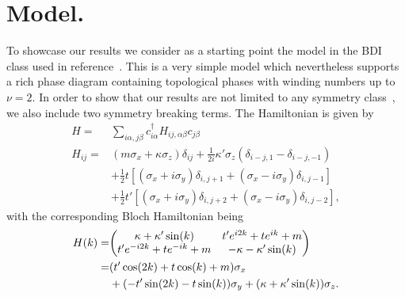 \documentclass[twocolumn,amsmath,longbibliography,amssymb,superscriptaddress]{revtex4-1}
\begin{document}
\section{Model.}
To showcase our results we consider as a starting point the model in the BDI class used in reference~\cite{Song2014}. 
This is a very simple model which nevertheless supports a rich phase diagram containing topological phases with winding numbers up to $\nu =2$. 
In order to show that our results are not limited to any symmetry class~\cite{ryu2010topological}, we also include two symmetry breaking terms. 
The Hamiltonian is  given by
\begin{align}
H =& \sum_{i\alpha,j\beta} c_{i\alpha}^\dagger H_{ij,\alpha \beta} c_{j\beta} \\
H_{ij} =& (m \sigma_x + \kappa \sigma_z)\delta_{ij}  + \frac{1}{2i}\kappa'\sigma_z (\delta_{i-j,1}-\delta_{i-j,-1})\nonumber\\
&+ \frac{1}{2} t \left[(\sigma_x + i \sigma_y)\delta_{i,j+1} + (\sigma_x - i \sigma_y) \delta_{i,j-1} \right] \nonumber\\
&+  \frac{1}{2} t' \left[(\sigma_x + i \sigma_y)\delta_{i,j+2} + (\sigma_x - i \sigma_y) \delta_{i,j-2} \right],
\label{bdi_model}
\end{align}
with the corresponding Bloch Hamiltonian being
\begin{align}
H(k)=&\mqty( \kappa + \kappa' \sin(k) & t' e^{i2k} + t e^{ik}+m \nonumber\\t' e^{-i2k} + t e^{-ik}+m & -\kappa-\kappa' \sin(k)  )\nonumber \\
=& (t' \cos(2k)+t\cos(k)+m)\sigma_x \\
&+ (-t' \sin(2k)-t\sin(k))\sigma_y + (\kappa+\kappa'\sin(k)) \sigma_z.\nonumber
\end{align}
\end{document}
